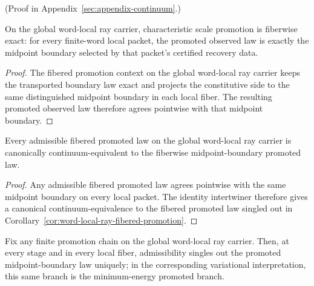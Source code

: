 (Proof in Appendix~\ref{sec:appendix-continuum}.)

\begin{corollary}
\label{cor:word-local-ray-fibered-promotion}
On the global word-local ray carrier, characteristic scale promotion is
fiberwise exact: for every finite-word local packet, the promoted observed law
is exactly the midpoint boundary selected by that packet's certified recovery
data.
\end{corollary}

\begin{proof}
The fibered promotion context on the global word-local ray carrier keeps the
transported boundary law exact and projects the constitutive side to the same
distinguished midpoint boundary in each local fiber. The resulting promoted
observed law therefore agrees pointwise with that midpoint boundary.
\end{proof}

\begin{corollary}
\label{cor:word-local-ray-fibered-equivalence}
Every admissible fibered promoted law on the global word-local ray carrier is
canonically continuum-equivalent to the fiberwise midpoint-boundary promoted
law.
\end{corollary}

\begin{proof}
Any admissible fibered promoted law agrees pointwise with the same midpoint
boundary on every local packet. The identity intertwiner therefore gives a
canonical continuum-equivalence to the fibered promoted law singled out in
Corollary~\ref{cor:word-local-ray-fibered-promotion}.
\end{proof}

\begin{corollary}
\label{cor:word-local-ray-fibered-admissible}
Fix any finite promotion chain on the global word-local ray carrier. Then, at
every stage and in every local fiber, admissibility singles out the promoted
midpoint-boundary law uniquely; in the corresponding variational
interpretation, this same branch is the minimum-energy promoted branch.
\end{corollary}

